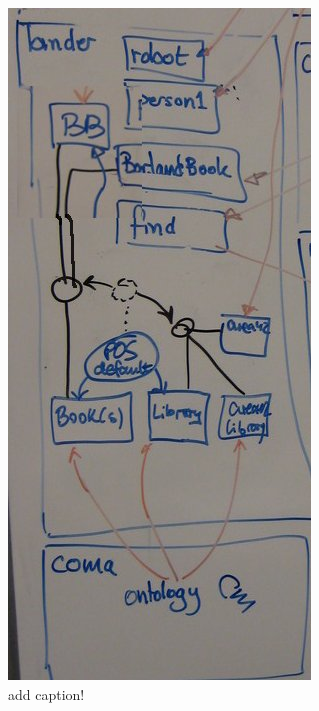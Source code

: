 \documentclass{article}
\begin{document}
\begin{figure}[bth]
\centering
	\includegraphics[width=\linewidth]{explorer_3.jpg}
	\caption{add caption!} 
\label{fig:coma_default}
\end{figure}
\end{document}
